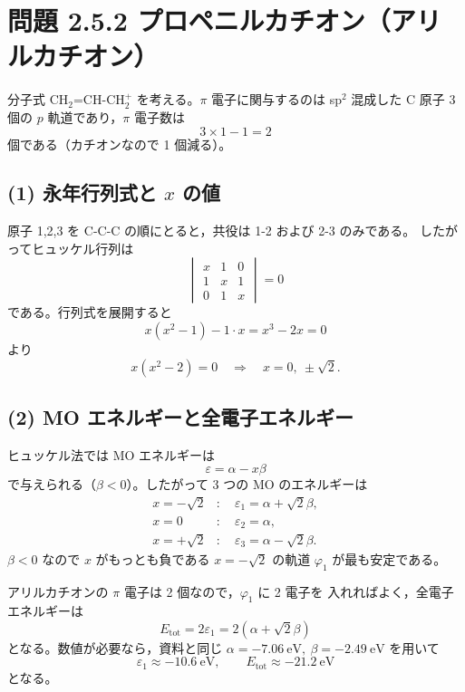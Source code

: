 \documentclass[a4paper,12pt]{jlreq}
\begin{document}
\newpage





\section*{問題 2.5.2 プロペニルカチオン（アリルカチオン）}

分子式 CH$_2$=CH-CH$_2^+$ を考える。$\pi$ 電子に関与するのは
sp$^2$ 混成した C 原子 3 個の $p$ 軌道であり，$\pi$ 電子数は
\[
3\times 1 - 1 = 2
\]
個である（カチオンなので 1 個減る）。

\subsection*{(1) 永年行列式と $x$ の値}

原子 1,2,3 を C-C-C の順にとると，共役は 1-2 および 2-3 のみである。
したがってヒュッケル行列は
\[
\begin{vmatrix}
x & 1 & 0 \\
1 & x & 1 \\
0 & 1 & x
\end{vmatrix}=0
\]
である。行列式を展開すると
\[
x(x^2-1) - 1\cdot x = x^3-2x = 0
\]
より
\[
x(x^2-2)=0 \quad\Rightarrow\quad
x = 0,\ \pm\sqrt{2}.
\]

\subsection*{(2) MO エネルギーと全電子エネルギー}

ヒュッケル法では MO エネルギーは
\[
\varepsilon = \alpha - x\beta
\]
で与えられる（$\beta<0$）。したがって 3 つの MO のエネルギーは
\begin{align*}
x=-\sqrt{2}&:\quad \varepsilon_1 = \alpha + \sqrt{2}\beta,\\
x=0       &:\quad \varepsilon_2 = \alpha,\\
x=+\sqrt{2}&:\quad \varepsilon_3 = \alpha - \sqrt{2}\beta.
\end{align*}
$\beta<0$ なので $x$ がもっとも負である $x=-\sqrt{2}$ の軌道
$\varphi_1$ が最も安定である。

アリルカチオンの $\pi$ 電子は 2 個なので，$\varphi_1$ に 2 電子を
入れればよく，全電子エネルギーは
\[
E_{\mathrm{tot}} = 2\varepsilon_1
                  = 2(\alpha + \sqrt{2}\beta)
\]
となる。数値が必要なら，資料と同じ
$\alpha=-7.06\ \mathrm{eV},\ \beta=-2.49\ \mathrm{eV}$ を用いて
\[
\varepsilon_1 \approx -10.6\ \mathrm{eV},\qquad
E_{\mathrm{tot}} \approx -21.2\ \mathrm{eV}
\]
となる。
\end{document}
